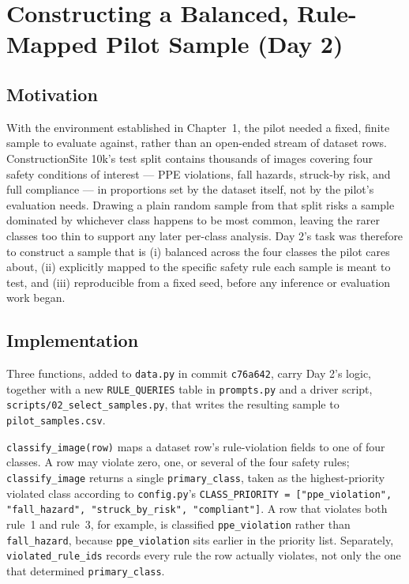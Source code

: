 \chapter{Constructing a Balanced, Rule-Mapped Pilot Sample (Day 2)}
\label{chap:day02}

\section{Motivation}

With the environment established in Chapter~1, the pilot needed a fixed, finite sample to evaluate
against, rather than an open-ended stream of dataset rows. ConstructionSite 10k's test split
contains thousands of images covering four safety conditions of interest --- PPE violations, fall
hazards, struck-by risk, and full compliance --- in proportions set by the dataset itself, not by
the pilot's evaluation needs. Drawing a plain random sample from that split risks a sample
dominated by whichever class happens to be most common, leaving the rarer classes too thin to
support any later per-class analysis. Day 2's task was therefore to construct a sample that is
(i) balanced across the four classes the pilot cares about, (ii) explicitly mapped to the specific
safety rule each sample is meant to test, and (iii) reproducible from a fixed seed, before any
inference or evaluation work began.

\section{Implementation}

Three functions, added to \texttt{data.py} in commit \texttt{c76a642}, carry Day 2's logic, together
with a new \texttt{RULE\_QUERIES} table in \texttt{prompts.py} and a driver script,
\texttt{scripts/02\_select\_samples.py}, that writes the resulting sample to
\texttt{pilot\_samples.csv}.

\texttt{classify\_image(row)} maps a dataset row's rule-violation fields to one of four classes.
A row may violate zero, one, or several of the four safety rules; \texttt{classify\_image} returns
a single \texttt{primary\_class}, taken as the highest-priority violated class according to
\texttt{config.py}'s \texttt{CLASS\_PRIORITY = ["ppe\_violation", "fall\_hazard",
"struck\_by\_risk", "compliant"]}. A row that violates both rule~1 and rule~3, for example, is
classified \texttt{ppe\_violation} rather than \texttt{fall\_hazard}, because \texttt{ppe\_violation}
sits earlier in the priority list. Separately, \texttt{violated\_rule\_ids} records every rule the
row actually violates, not only the one that determined \texttt{primary\_class}.

